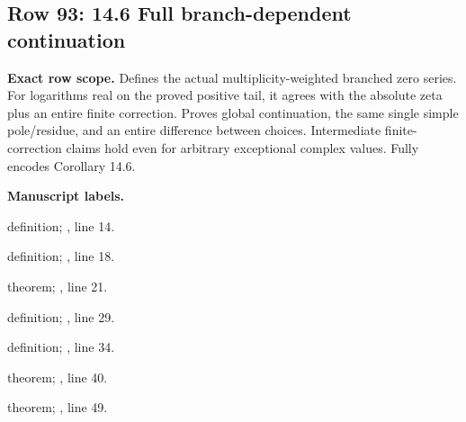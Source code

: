 \subsection{Row 93: 14.6 Full branch-dependent continuation}
\label{row:93}
\textbf{Exact row scope.} Defines the actual multiplicity-weighted branched zero series. For logarithms real on the proved positive tail, it agrees with the absolute zeta plus an entire finite correction. Proves global continuation, the same single simple pole/residue, and an entire difference between choices. Intermediate finite-correction claims hold even for arbitrary exceptional complex values. Fully encodes Corollary 14.6.\par\smallskip
\textbf{Manuscript labels.} \par\smallskip
{\small{}\par}
{\footnotesize\color{muted}definition; , line 14.\par}\smallskip
{\small{}\par}
{\footnotesize\color{muted}definition; , line 18.\par}\smallskip
{\small{}\par}
{\footnotesize\color{muted}theorem; , line 21.\par}\smallskip
{\small{}\par}
{\footnotesize\color{muted}definition; , line 29.\par}\smallskip
{\small{}\par}
{\footnotesize\color{muted}definition; , line 34.\par}\smallskip
{\small{}\par}
{\footnotesize\color{muted}theorem; , line 40.\par}\smallskip
{\small{}\par}
{\footnotesize\color{muted}theorem; , line 49.\par}\smallskip

